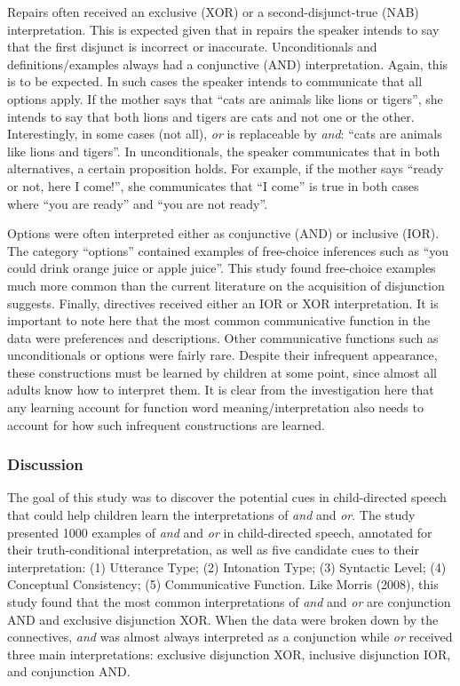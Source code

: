 \documentclass[floatsintext,man]{apa6}
\theoremstyle{definition}
\theoremstyle{definition}
\theoremstyle{definition}
\theoremstyle{remark}
\begin{document}
Repairs often received an exclusive (XOR) or a second-disjunct-true
(NAB) interpretation. This is expected given that in repairs the speaker
intends to say that the first disjunct is incorrect or inaccurate.
Unconditionals and definitions/examples always had a conjunctive (AND)
interpretation. Again, this is to be expected. In such cases the speaker
intends to communicate that all options apply. If the mother says that
\enquote{cats are animals like lions or tigers}, she intends to say that
both lions and tigers are cats and not one or the other. Interestingly,
in some cases (not all), \emph{or} is replaceable by \emph{and}:
\enquote{cats are animals like lions and tigers}. In unconditionals, the
speaker communicates that in both alternatives, a certain proposition
holds. For example, if the mother says \enquote{ready or not, here I
come!}, she communicates that \enquote{I come} is true in both cases
where \enquote{you are ready} and \enquote{you are not ready}.

Options were often interpreted either as conjunctive (AND) or inclusive
(IOR). The category \enquote{options} contained examples of free-choice
inferences such as \enquote{you could drink orange juice or apple
juice}. This study found free-choice examples much more common than the
current literature on the acquisition of disjunction suggests. Finally,
directives received either an IOR or XOR interpretation. It is important
to note here that the most common communicative function in the data
were preferences and descriptions. Other communicative functions such as
unconditionals or options were fairly rare. Despite their infrequent
appearance, these constructions must be learned by children at some
point, since almost all adults know how to interpret them. It is clear
from the investigation here that any learning account for function word
meaning/interpretation also needs to account for how such infrequent
constructions are learned.

\subsubsection{Discussion}\label{discussion}

The goal of this study was to discover the potential cues in
child-directed speech that could help children learn the interpretations
of \emph{and} and \emph{or}. The study presented 1000 examples of
\emph{and} and \emph{or} in child-directed speech, annotated for their
truth-conditional interpretation, as well as five candidate cues to
their interpretation: (1) Utterance Type; (2) Intonation Type; (3)
Syntactic Level; (4) Conceptual Consistency; (5) Communicative Function.
Like Morris (2008), this study found that the most common
interpretations of \emph{and} and \emph{or} are conjunction AND and
exclusive disjunction XOR. When the data were broken down by the
connectives, \emph{and} was almost always interpreted as a conjunction
while \emph{or} received three main interpretations: exclusive
disjunction XOR, inclusive disjunction IOR, and conjunction AND.
\end{document}
